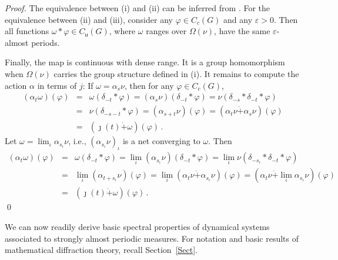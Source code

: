 \documentclass[11pt, a4wide]{amsart}
\numberwithin{lemma}{section}
\begin{document}
\begin{proof}
The equivalence between (i) and (ii) can be inferred from \cite[Lemma\,4.2]{LR}.
For the equivalence between (ii) and (iii), consider any $\varphi\in C_c(G)$ and any $\varepsilon>0$. Then all functions $\omega *\varphi\in C_\mathsf{u}(G)$, where $\omega$ ranges over $\varOmega(\nu)$, have the same $\varepsilon$-almost periods.


 Finally, the map is continuous with dense range.  It is a group homomorphism when $\Omega (\nu)$ carries the group structure defined in (i). It remains to compute the action $\alpha$ in terms of $j$:
If $\omega = \alpha_s \nu$, then for any $\varphi \in C_c(G)$,
\begin{eqnarray*}
(\alpha_t\omega)(\varphi) &=& \omega(\delta_{-t} \ast \varphi) = (\alpha_s \nu) (\delta_{-t} \ast \varphi) = \nu(\delta_{-s} \ast \delta_{-t} \ast \varphi) \\
 &=& \nu(\delta_{-s-t} \ast \varphi) = (\alpha_{s+t} \nu)(\varphi) = (\alpha_t \nu \dot{+} \alpha_s \nu)(\varphi) \\
 &=& (\jmath(t) \dot{+} \omega)(\varphi)\,.
\end{eqnarray*}
%
Let $\omega = \lim_{\iota} \alpha_{s_\iota}\nu$, i.e., $(\alpha_{s_\iota}\nu)_\iota$ is a net converging to $\omega$. Then
%
\begin{eqnarray*}
(\alpha_t\omega)(\varphi) &=& \omega(\delta_{-t} \ast \varphi) = \lim_{\iota} (\alpha_{s_\iota} \nu)(\delta_{-t} \ast \varphi)
= \lim_{\iota} \nu(\delta_{-s_\iota} \ast \delta_{-t} \ast \varphi) \\
&=& \lim_{\iota} (\alpha_{t+ s_\iota} \nu)(\varphi) = \lim_{\iota} (\alpha_{t} \nu \dot{+} \alpha_{s_\iota} \nu)(\varphi)
= (\alpha_{t} \nu \dot{+} \lim_{\iota} \alpha_{s_\iota} \nu)(\varphi) \\
&=& (\jmath(t) \dot{+} \omega)(\varphi)\,.
\end{eqnarray*}
\qed
\end{proof}


We can now readily derive basic spectral properties of dynamical systems associated to strongly almost periodic measures.  For notation and basic results of mathematical diffraction theory, recall Section~\ref{Sect}.
\end{document}
